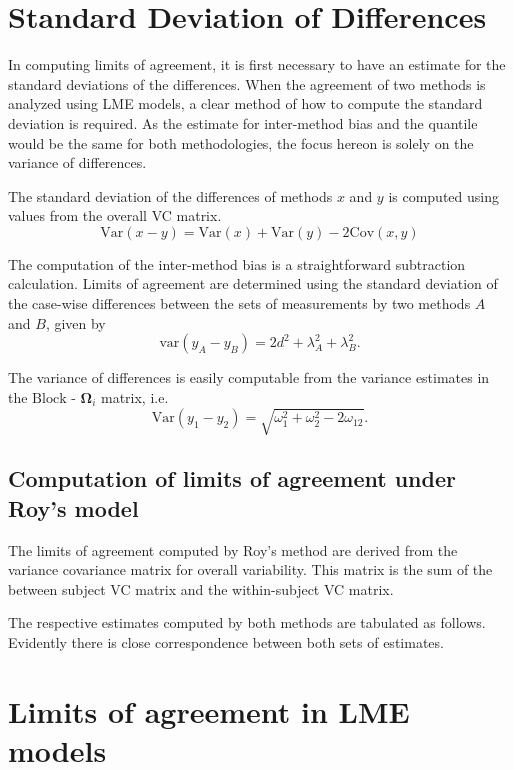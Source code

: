 \documentclass[12pt, a4paper]{report}
\theoremstyle{plain}
\theoremstyle{definition}
\theoremstyle{remark}
\begin{document}
\section{Standard Deviation of Differences}
In computing limits of agreement, it is first necessary to have an estimate for the standard deviations of the differences. When the agreement of two methods is analyzed using LME models, a clear method of how to compute the standard deviation is required. As the estimate for inter-method bias and the quantile would be the same for both methodologies, the focus hereon is solely on the variance of differences.

The standard deviation of the differences of methods $x$ and $y$ is computed using values from the overall VC matrix.
\[
\mbox{Var}(x - y ) = \mbox{Var} ( x )  + \mbox{Var} ( y ) - 2\mbox{Cov} ( x ,y )
\]

The computation of the inter-method bias is a straightforward subtraction calculation. Limits of agreement are determined using the standard deviation of the case-wise differences between the sets of measurements by two methods $A$ and $B$, given by
 \begin{equation}
 \mbox{var} (y_{A}-y_{B}) = 2d^2 + \lambda^2_{A}+ \lambda^2_{B}.
 \end{equation}
 
 The variance of differences is easily computable from the variance estimates in the ${\mbox{Block - }\boldsymbol \Omega_{i}}$ matrix, i.e.
\[
\mathrm{Var}(y_1 - y_2) = \sqrt{ \omega^2_1 + \omega^2_2 - 2\omega_{12}}.
\]
\subsection{Computation of limits of agreement under Roy's model}
The limits of agreement computed by Roy's method are derived from the variance covariance matrix for overall variability.
This matrix is the sum of the between subject VC matrix and the within-subject VC matrix.



The respective estimates computed by both methods are tabulated as follows. Evidently there is close correspondence between both sets of estimates.




\section{Limits of agreement in LME models}
\end{document}
